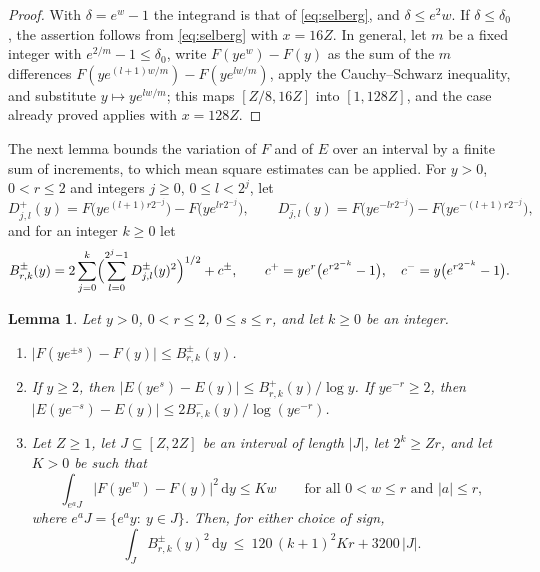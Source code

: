 \documentclass[11pt,reqno]{amsart}
\newtheorem{lemma}[theorem]{Lemma}
\theoremstyle{definition}
\theoremstyle{remark}
\numberwithin{equation}{section}
\newcommand{\dd}{\mathrm{d}}
\begin{document}
\begin{proof}
With $\delta=e^w-1$ the integrand is that of \eqref{eq:selberg}, and $\delta\le e^2w$. If $\delta\le\delta_0$, the assertion follows from \eqref{eq:selberg} with $x=16Z$. In general, let $m$ be a fixed integer with $e^{2/m}-1\le\delta_0$, write $F(ye^w)-F(y)$ as the sum of the $m$ differences $F(ye^{(l+1)w/m})-F(ye^{lw/m})$, apply the Cauchy--Schwarz inequality, and substitute $y\mapsto ye^{lw/m}$; this maps $[Z/8,16Z]$ into $[1,128Z]$, and the case already proved applies with $x=128Z$.
\end{proof}

The next lemma bounds the variation of $F$ and of $E$ over an interval by a finite sum of increments, to which mean square estimates can be applied. For $y>0$, $0<r\le2$ and integers $j\ge0$, $0\le l<2^j$, let
\[
 D^+_{j,l}(y)=F\bigl(ye^{(l+1)r2^{-j}}\bigr)-F\bigl(ye^{lr2^{-j}}\bigr),\qquad
 D^-_{j,l}(y)=F\bigl(ye^{-lr2^{-j}}\bigr)-F\bigl(ye^{-(l+1)r2^{-j}}\bigr),
\]
and for an integer $k\ge0$ let
\[
 B^\pm_{r,k}(y)=2\sum_{j=0}^k\Bigl(\sum_{l=0}^{2^j-1}D^\pm_{j,l}(y)^2\Bigr)^{1/2}+c^\pm,\qquad c^+=ye^r\bigl(e^{r2^{-k}}-1\bigr),\quad c^-=y\bigl(e^{r2^{-k}}-1\bigr).
\]

\begin{lemma}\label{lem:maximal}
Let $y>0$, $0<r\le2$, $0\le s\le r$, and let $k\ge0$ be an integer.
\begin{enumerate}[label=\textup{(\alph*)},leftmargin=*]
\item $\bigl|F(ye^{\pm s})-F(y)\bigr|\le B^\pm_{r,k}(y)$.
\item If $y\ge2$, then $\bigl|E(ye^{s})-E(y)\bigr|\le B^+_{r,k}(y)/\log y$. If $ye^{-r}\ge2$, then $\bigl|E(ye^{-s})-E(y)\bigr|\le2B^-_{r,k}(y)/\log(ye^{-r})$.
\item Let $Z\ge1$, let $J\subseteq[Z,2Z]$ be an interval of length $|J|$, let $2^k\ge Zr$, and let $K>0$ be such that
\begin{equation}\label{eq:maxhyp}
 \int_{e^aJ}\bigl|F(ye^w)-F(y)\bigr|^2\,\dd y\le Kw\qquad\text{for all }0<w\le r\text{ and }|a|\le r,
\end{equation}
where $e^aJ=\{e^ay:\ y\in J\}$. Then, for either choice of sign,
\[
 \int_JB^\pm_{r,k}(y)^2\,\dd y\ \le\ 120\,(k+1)^2Kr+3200\,|J| .
\]
\end{enumerate}
\end{lemma}
\end{document}
